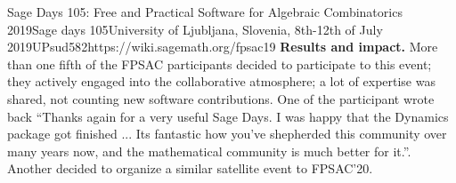 \begin{event}{Sage Days 105: Free and Practical Software for Algebraic Combinatorics 2019}{Sage days 105}{University of Ljubljana, Slovenia,
8th-12th of July 2019}{UPsud}{58}{2}{https://wiki.sagemath.org/fpsac19}
\textbf{Results and impact.} More than one fifth of the FPSAC
participants decided to participate to this event; they actively
engaged into the collaborative atmosphere; a lot of expertise was
shared, not counting new software contributions. One of the
participant wrote back ``Thanks again for a very useful Sage Days. I
was happy that the Dynamics package got finished ... Its fantastic how
you’ve shepherded this community over many years now, and the
mathematical community is much better for it.''. Another decided to
organize a similar satellite event to FPSAC'20.

\end{event}
